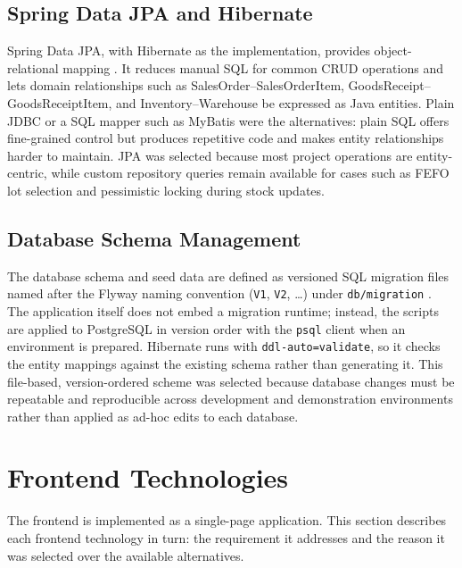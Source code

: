 \subsection{Spring Data JPA and Hibernate}
Spring Data JPA, with Hibernate as the implementation, provides
object-relational mapping \cite{bauer2015hibernate}. It reduces manual SQL for
common CRUD operations and lets domain relationships such as
SalesOrder--SalesOrderItem, GoodsReceipt--GoodsReceiptItem, and
Inventory--Warehouse be expressed as Java entities. Plain JDBC or a SQL mapper
such as MyBatis were the alternatives: plain SQL offers fine-grained control but
produces repetitive code and makes entity relationships harder to maintain. JPA
was selected because most project operations are entity-centric, while custom
repository queries remain available for cases such as FEFO lot selection and
pessimistic locking during stock updates.

\subsection{Database Schema Management}
The database schema and seed data are defined as versioned SQL migration files
named after the Flyway naming convention (\texttt{V1}, \texttt{V2}, \dots) under
\texttt{db/migration} \cite{flywayMigrations}. The application itself does not
embed a migration runtime; instead, the scripts are applied to PostgreSQL in
version order with the \texttt{psql} client when an environment is prepared.
Hibernate runs with \texttt{ddl-auto=validate}, so it checks the entity mappings
against the existing schema rather than generating it. This file-based,
version-ordered scheme was selected because database changes must be repeatable
and reproducible across development and demonstration environments rather than
applied as ad-hoc edits to each database.

\section{Frontend Technologies}
The frontend is implemented as a single-page application. This section describes
each frontend technology in turn: the requirement it addresses and the reason it
was selected over the available alternatives.

